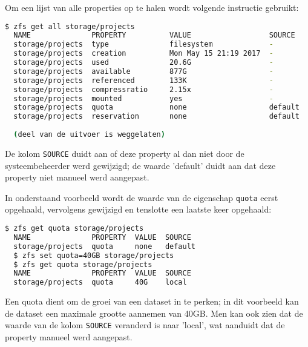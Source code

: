 Om een lijst van alle properties op te halen wordt volgende instructie gebruikt: 

\begin{lstlisting}[language=bash,style=command_style] 
  $ zfs get all storage/projects
  NAME              PROPERTY          VALUE                  SOURCE
  storage/projects  type              filesystem             -
  storage/projects  creation          Mon May 15 21:19 2017  -
  storage/projects  used              20.6G                  -
  storage/projects  available         877G                   -
  storage/projects  referenced        133K                   -
  storage/projects  compressratio     2.15x                  -
  storage/projects  mounted           yes                    -
  storage/projects  quota             none                   default
  storage/projects  reservation       none                   default
  
  (deel van de uitvoer is weggelaten)
\end{lstlisting}

De kolom \texttt{SOURCE} duidt aan of deze property al dan niet door de systeembeheerder werd gewijzigd; de waarde 'default' duidt aan dat deze property niet manueel werd aangepast.

\clearpage

In onderstaand voorbeeld wordt de waarde van de eigenschap \texttt{quota} eerst opgehaald, vervolgens gewijzigd en tenslotte een laatste keer opgehaald:

\begin{lstlisting}[language=bash,style=command_style] 
  $ zfs get quota storage/projects
  NAME              PROPERTY  VALUE  SOURCE
  storage/projects  quota     none   default
  $ zfs set quota=40GB storage/projects
  $ zfs get quota storage/projects
  NAME              PROPERTY  VALUE  SOURCE
  storage/projects  quota     40G    local
\end{lstlisting}

Een quota dient om de groei van een dataset in te perken; in dit voorbeeld kan de dataset een maximale grootte aannemen van 40GB. Men kan ook zien dat de waarde van de kolom \texttt{SOURCE} veranderd is naar 'local', wat aanduidt dat de property manueel werd aangepast.


